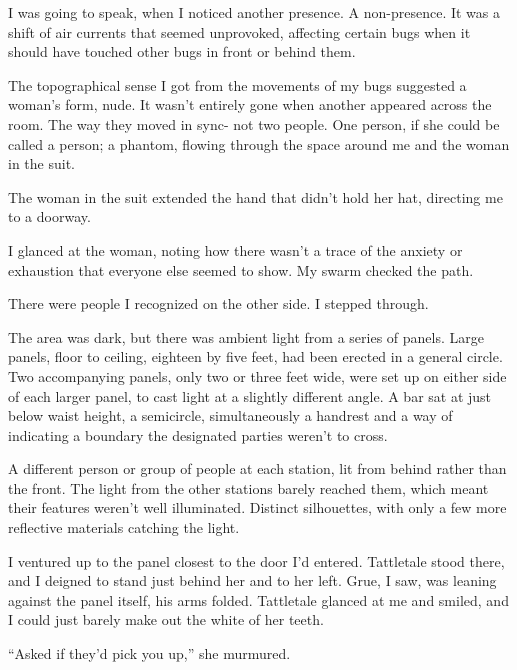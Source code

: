 I was going to speak, when I noticed another presence.  A non-presence.  It was a shift of air currents that seemed unprovoked, affecting certain bugs when it should have touched other bugs in front or behind them.



The topographical sense I got from the movements of my bugs suggested a woman's form, nude.  It wasn't entirely gone when another appeared across the room.  The way they moved in sync- not two people.  One person, if she could be called a person; a phantom, flowing through the space around me and the woman in the suit.



The woman in the suit extended the hand that didn't hold her hat, directing me to a doorway.



I glanced at the woman, noting how there wasn't a trace of the anxiety or exhaustion that everyone else seemed to show.  My swarm checked the path.



There were people I recognized on the other side.  I stepped through.



The area was dark, but there was ambient light from a series of panels.  Large panels, floor to ceiling, eighteen by five feet, had been erected in a general circle. Two accompanying panels, only two or three feet wide, were set up on either side of each larger panel, to cast light at a slightly different angle.  A bar sat at just below waist height, a semicircle, simultaneously a handrest and a way of indicating a boundary the designated parties weren't to cross.



A different person or group of people at each station, lit from behind rather than the front.  The light from the other stations barely reached them, which meant their features weren't well illuminated.  Distinct silhouettes, with only a few more reflective materials catching the light.



I ventured up to the panel closest to the door I'd entered.  Tattletale stood there, and I deigned to stand just behind her and to her left.  Grue, I saw, was leaning against the panel itself, his arms folded.  Tattletale glanced at me and smiled, and I could just barely make out the white of her teeth.



``Asked if they'd pick you up,'' she murmured.



